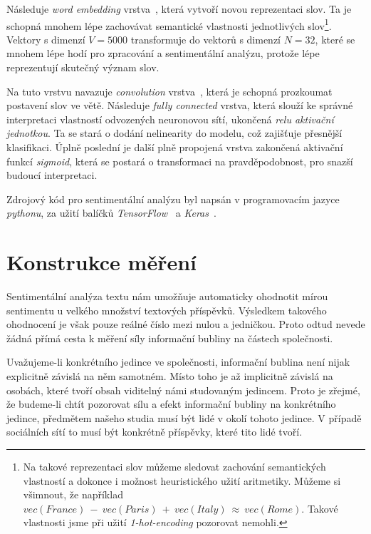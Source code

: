 \documentclass[12pt, a4paper]{article}
\numberwithin{equation}{section} 	%
\begin{document}
Následuje \textit{word embedding} vrstva~\cite{WordEmbedding1, WordEmbedding2}, která vytvoří novou reprezentaci slov. Ta je schopná mnohem lépe zachovávat semantické vlastnosti jednotlivých slov\footnote{Na takové reprezentaci slov můžeme sledovat zachování semantických vlastností a dokonce i možnost heuristického užití aritmetiky. Můžeme si všimnout, že například $vec(\textit{France})~-~vec(\textit{Paris})~+~vec(\textit{Italy})~\approx~vec(\textit{Rome})$. Takové vlastnosti jsme při užití \textit{1-hot-encoding} pozorovat nemohli.}. Vektory s dimenzí $V = 5000$ transformuje do vektorů s dimenzí $N = 32$, které se mnohem lépe hodí pro zpracování a sentimentální analýzu, protože lépe reprezentují skutečný význam slov.

Na tuto vrstvu navazuje \textit{convolution} vrstva~\cite{CNN}, která je schopná prozkoumat postavení slov ve větě. Následuje \textit{fully connected} vrstva, která slouží ke správné interpretaci vlastností odvozených neuronovou sítí, ukončená \textit{relu aktivační jednotkou}. Ta se stará o dodání nelinearity do modelu, což zajišťuje přesnější klasifikaci. Úplně poslední je další plně propojená vrstva zakončená aktivační funkcí \textit{sigmoid}, která se postará o transformaci na pravděpodobnost, pro snazší budoucí interpretaci.

Zdrojový kód pro sentimentální analýzu byl napsán v programovacím jazyce \textit{pythonu}, za užití balíčků \textit{TensorFlow}~\cite{TensorFlow} a \textit{Keras}~\cite{keras}.


\newpage
\section{Konstrukce měření}
\noindent Sentimentální analýza textu nám umožňuje automaticky ohodnotit mírou sentimentu u velkého množství textových příspěvků. Výsledkem takového ohodnocení je však pouze reálné číslo mezi nulou a jedničkou. Proto odtud nevede žádná přímá cesta k měření síly informační bubliny na částech společnosti. %

Uvažujeme-li konkrétního jedince ve společnosti, informační bublina není nijak explicitně závislá na něm samotném. Místo toho je až implicitně závislá na osobách, které tvoří obsah viditelný námi studovaným jedincem. Proto je zřejmé, že budeme-li chtít pozorovat sílu a efekt informační bubliny na konkrétního jedince, předmětem našeho studia musí být lidé v okolí tohoto jedince. V případě sociálních sítí to musí být konkrétně příspěvky, které tito lidé tvoří.
\end{document}

